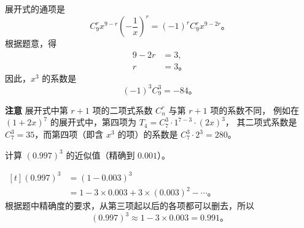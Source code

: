 \jie 展开式的通项是
$$ C_9^r x^{9-r} \left( -\dfrac{1}{x} \right)^r = (-1)^r C_9^r x^{9-2r} \text{。} $$
根据题意，得
\begin{align*}
    9 - 2r &= 3, \\
         r &= 3 \text{。}
\end{align*}
因此，$x^3$ 的系数是
$$ (-1)^3 C_9^3 = -84 \text{。} $$


\textbf{注意} \quad 展开式中第 $r+1$ 项的二项式系数 $C_n^r$ 与第 $r+1$ 项的系数不同，
例如在 $(1 + 2x)^7$ 的展开式中，第四项为 $T_4 = C_7^3 \cdot 1^{7-3} \cdot (2x)^3$，
其二项式系数是 $C_7^3 = 35$，而第四项（即含 $x^3$ 的项）的系数是 $C_7^3 \cdot 2^3 = 280$。



\liti 计算 $(0.997)^3$ 的近似值（精确到 $0.001$）。

\jie \; $\begin{aligned}[t]
    (0.997)^3 &= (1 - 0.003)^3 \\
        &= 1 - 3 \times 0.003 + 3 \times (0.003)^2 - \cdots \text{。}
\end{aligned}$ \\
根据题中精确度的要求，从第三项起以后的各项都可以删去，所以
$$ (0.997)^3 \approx 1 - 3 \times 0.003 = 0.991 \text{。} $$



\lianxi
\begin{xiaotis}







\end{xiaotis}

